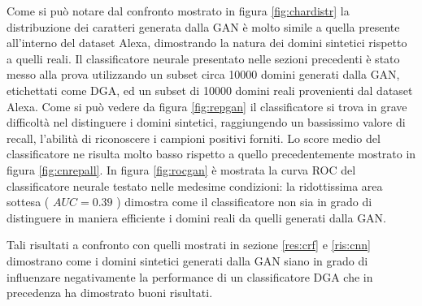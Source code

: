 Come si può notare dal confronto mostrato in figura \ref{fig:chardistr} la distribuzione dei caratteri generata dalla GAN è molto simile a quella presente all'interno del dataset Alexa, dimostrando la natura dei domini sintetici rispetto a quelli reali.
Il classificatore neurale presentato nelle sezioni precedenti è stato messo alla prova utilizzando un subset circa 10000 domini generati dalla GAN, etichettati come DGA, ed un subset di 10000 domini reali provenienti dal dataset Alexa. Come si può vedere da figura \ref{fig:repgan} il classificatore si trova in grave difficoltà nel distinguere i domini sintetici, raggiungendo un bassissimo valore di recall, l'abilità di riconoscere i campioni positivi forniti. Lo score medio del classificatore ne risulta molto basso  rispetto a quello precedentemente mostrato in figura \ref{fig:cnrepall}. In figura \ref{fig:rocgan} è mostrata la curva ROC del classificatore neurale testato nelle medesime condizioni: la ridottissima area sottesa  ( $ AUC = 0.39$ ) dimostra come il classificatore non sia in grado di distinguere in maniera efficiente i domini reali da quelli generati dalla GAN. 

Tali risultati a confronto con quelli mostrati in sezione \ref{res:crf} e \ref{ris:cnn} dimostrano come i domini sintetici generati dalla GAN siano in grado di influenzare negativamente la performance di un classificatore DGA che in precedenza ha dimostrato buoni risultati.

